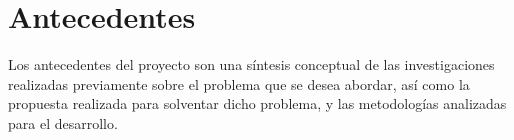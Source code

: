 

\chapter{Antecedentes}
\thispagestyle{chapterpage}

Los antecedentes del proyecto son una síntesis conceptual de las 
investigaciones realizadas previamente sobre el problema que se 
desea abordar, así como la propuesta realizada para solventar dicho 
problema, y las metodologías analizadas para el desarrollo. 











